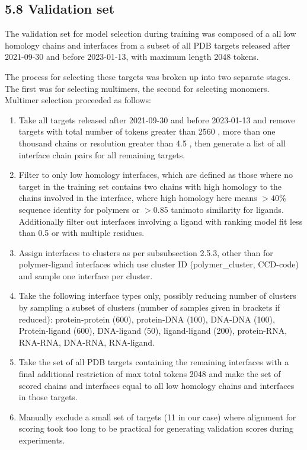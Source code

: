 \documentclass[10pt]{article}
\begin{document}
\subsection*{5.8 Validation set}
The validation set for model selection during training was composed of a all low homology chains and interfaces from a subset of all PDB targets released after 2021-09-30 and before 2023-01-13, with maximum length 2048 tokens.

The process for selecting these targets was broken up into two separate stages. The first was for selecting multimers, the second for selecting monomers. Multimer selection proceeded as follows:

\begin{enumerate}
  \item Take all targets released after 2021-09-30 and before 2023-01-13 and remove targets with total number of tokens greater than 2560 , more than one thousand chains or resolution greater than 4.5 , then generate a list of all interface chain pairs for all remaining targets.
  \item Filter to only low homology interfaces, which are defined as those where no target in the training set contains two chains with high homology to the chains involved in the interface, where high homology here means $> 40 \%$ sequence identity for polymers or $>0.85$ tanimoto similarity for ligands. Additionally filter out interfaces involving a ligand with ranking model fit less than 0.5 or with multiple residues.
  \item Assign interfaces to clusters as per subsubsection 2.5.3, other than for polymer-ligand interfaces which use cluster ID (polymer\_cluster, CCD-code) and sample one interface per cluster.
  \item Take the following interface types only, possibly reducing number of clusters by sampling a subset of clusters (number of samples given in brackets if reduced): protein-protein (600), protein-DNA (100), DNA-DNA (100), Protein-ligand (600), DNA-ligand (50), ligand-ligand (200), protein-RNA, RNA-RNA, DNA-RNA, RNA-ligand.
  \item Take the set of all PDB targets containing the remaining interfaces with a final additional restriction of max total tokens 2048 and make the set of scored chains and interfaces equal to all low homology chains and interfaces in those targets.
  \item Manually exclude a small set of targets (11 in our case) where alignment for scoring took too long to be practical for generating validation scores during experiments.
\end{enumerate}
\end{document}
